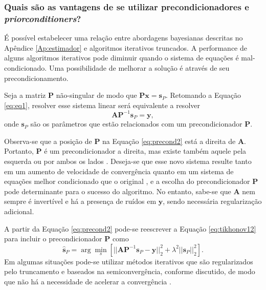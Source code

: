 \subsubsection{Quais são as vantagens de se utilizar precondicionadores e \textit{priorconditioners}?}

É possível estabelecer uma relação entre abordagens bayesianas descritas no Apêndice \ref{Ap:estimador} e algoritmos iterativos truncados. A performance de alguns algoritmos iterativos pode diminuir quando o sistema de equações é mal-condicionado. Uma possibilidade de melhorar a solução é através de seu precondicionamento. 

Seja a matriz $\mathbf{P}$ não-singular de modo que $\mathbf{P}\mathbf{x} = \mathbf{s}_{P}$. Retomando a Equação \eqref{eq:eq1}, resolver esse sistema linear será equivalente a resolver \cite[pág. 82]{Mueller2012} 
\begin{equation}
\mathbf{A}\mathbf{P}^{-1} \mathbf{s}_{P} = \mathbf{y},
\label{eq:precond2}
\end{equation}
onde $\mathbf{s}_P$ são os parâmetros que estão relacionados com um precondicionador $\mathbf{P}$.

Observa-se que a posição de $\mathbf{P}$ na Equação \eqref{eq:precond2} está a direita de $\mathbf{A}$. Portanto, $\mathbf{P}$ é um precondicionador a direita, mas existe também aquele pela esquerda ou por ambos os lados \cite[págs. 107-8]{calvetti2007introduction}. Deseja-se que esse novo sistema resulte tanto em um aumento de velocidade de convergência quanto em um sistema de equações melhor condicionado que o original \cite[pág. 179]{aster2019parameter}, \cite[págs. 81-2]{Mueller2012} e a escolha do precondicionador $\mathbf{P}$ pode determinante para o sucesso do algoritmo. No entanto, sabe-se que $\mathbf{A}$ nem sempre é invertível e há a presença de ruídos em $\mathbf{y}$, sendo necessária regularização adicional. 

A partir da Equação \eqref{eq:precond2} pode-se reescrever a Equação \eqref{eq:tikhonov12} para incluir o precondicionador $\mathbf{P}$ como \cite[pág. 110]{calvetti2007introduction} 
\begin{equation}
\bm{\hat{s}}_P = \arg\min\limits_{s} \left[ \vert \vert \mathbf{A} \mathbf{P}^{-1} \mathbf{s}_{P} - \mathbf{y} \vert \vert^2_2 + \lambda^2 \vert \vert \mathbf{s}_{P} \vert \vert_2^2 \right].
\label{eq:precond3}
\end{equation}
Em algumas situações pode-se utilizar métodos iterativos que são regularizados pelo truncamento e baseados na semiconvergência, conforme discutido, de modo que não há a necessidade de acelerar a convergência  \cite{Calvetti2005}. 

